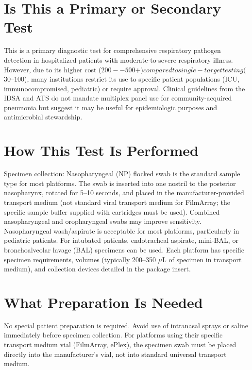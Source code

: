\section*{Is This a Primary or Secondary Test}
This is a primary diagnostic test for comprehensive respiratory pathogen detection in hospitalized patients with moderate-to-severe respiratory illness. However, due to its higher cost ($200--500+) compared to single-target testing ($30--100), many institutions restrict its use to specific patient populations (ICU, immunocompromised, pediatric) or require approval. Clinical guidelines from the IDSA and ATS do not mandate multiplex panel use for community-acquired pneumonia but suggest it may be useful for epidemiologic purposes and antimicrobial stewardship.

\section*{How This Test Is Performed}
Specimen collection: Nasopharyngeal (NP) flocked swab is the standard sample type for most platforms. The swab is inserted into one nostril to the posterior nasopharynx, rotated for 5--10 seconds, and placed in the manufacturer-provided transport medium (not standard viral transport medium for FilmArray; the specific sample buffer supplied with cartridges must be used). Combined nasopharyngeal and oropharyngeal swabs may improve sensitivity. Nasopharyngeal wash/aspirate is acceptable for most platforms, particularly in pediatric patients. For intubated patients, endotracheal aspirate, mini-BAL, or bronchoalveolar lavage (BAL) specimens can be used. Each platform has specific specimen requirements, volumes (typically 200--350 $\mu$L of specimen in transport medium), and collection devices detailed in the package insert.

\section*{What Preparation Is Needed}
No special patient preparation is required. Avoid use of intranasal sprays or saline immediately before specimen collection. For platforms using their specific transport medium vial (FilmArray, ePlex), the specimen swab must be placed directly into the manufacturer's vial, not into standard universal transport medium.

